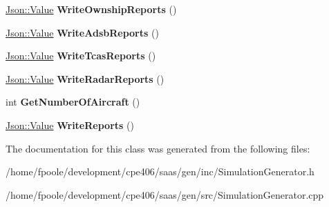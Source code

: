 \begin{DoxyCompactItemize}
\item 
\hypertarget{class_simulation_generator_a58cbde2b3b1d24691b91be2f9a0d6ddb}{}\hyperlink{class_json_1_1_value}{Json\+::\+Value} {\bfseries Write\+Ownship\+Reports} ()\label{class_simulation_generator_a58cbde2b3b1d24691b91be2f9a0d6ddb}

\item 
\hypertarget{class_simulation_generator_a86879188e26d34e907a14c43200722fc}{}\hyperlink{class_json_1_1_value}{Json\+::\+Value} {\bfseries Write\+Adsb\+Reports} ()\label{class_simulation_generator_a86879188e26d34e907a14c43200722fc}

\item 
\hypertarget{class_simulation_generator_a3322c5cf9e9257eafe1c7d8692b0129f}{}\hyperlink{class_json_1_1_value}{Json\+::\+Value} {\bfseries Write\+Tcas\+Reports} ()\label{class_simulation_generator_a3322c5cf9e9257eafe1c7d8692b0129f}

\item 
\hypertarget{class_simulation_generator_a11daef549c5ccee74664faddcbee3c8c}{}\hyperlink{class_json_1_1_value}{Json\+::\+Value} {\bfseries Write\+Radar\+Reports} ()\label{class_simulation_generator_a11daef549c5ccee74664faddcbee3c8c}

\item 
\hypertarget{class_simulation_generator_ab07bcc073ca1725d5f6f51a8105af8a4}{}int {\bfseries Get\+Number\+Of\+Aircraft} ()\label{class_simulation_generator_ab07bcc073ca1725d5f6f51a8105af8a4}

\item 
\hypertarget{class_simulation_generator_a3b0ca3c04eeab2f7005462ba9001d2c6}{}\hyperlink{class_json_1_1_value}{Json\+::\+Value} {\bfseries Write\+Reports} ()\label{class_simulation_generator_a3b0ca3c04eeab2f7005462ba9001d2c6}

\end{DoxyCompactItemize}


The documentation for this class was generated from the following files\+:\begin{DoxyCompactItemize}
\item 
/home/fpoole/development/cpe406/saas/gen/inc/Simulation\+Generator.\+h\item 
/home/fpoole/development/cpe406/saas/gen/src/Simulation\+Generator.\+cpp\end{DoxyCompactItemize}
